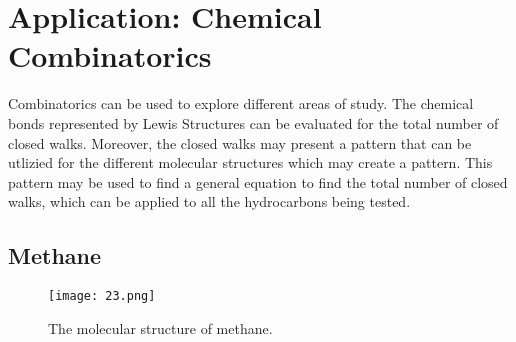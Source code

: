 \chapter{Application: Chemical Combinatorics}
Combinatorics can be used to explore different areas of study.  The chemical bonds represented by Lewis Structures can be evaluated for the total number of closed walks.  Moreover, the closed walks may present a pattern that can be utlizied for the different molecular structures which may create a pattern.  This pattern may be used to find a general equation to find the total number of closed walks, which can be applied to all the hydrocarbons being tested. %

\section{Methane}
\begin{figure}[h]
         \centering
         \texttt{[image: 23.png]}
         \caption{\small{The molecular structure of methane.}}
 \end{figure}

